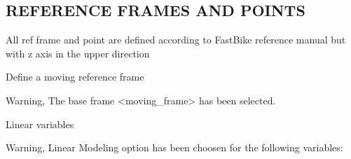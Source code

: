 \documentclass{article}
\begin{document}
\subsection{\textbf{REFERENCE FRAMES AND POINTS}}
\begin{maplegroup}
\begin{Maple Normal}{
All ref frame and point are defined according to FastBike reference manual but with z axis in the upper direction}\end{Maple Normal}

\end{maplegroup}
\begin{maplegroup}
\begin{Maple Normal}{
Define a moving reference frame}\end{Maple Normal}

\end{maplegroup}
\begin{maplegroup}
\begin{mapleinput}
\end{mapleinput}
\mapleresult
\underline{}Warning, The base frame <moving\_frame> has been selected.\underline{}\end{maplegroup}
\begin{maplegroup}
\begin{Maple Normal}{
Linear variables}\end{Maple Normal}

\end{maplegroup}
\begin{maplegroup}
\begin{mapleinput}
\end{mapleinput}
\mapleresult
\underline{}Warning, Linear Modeling option has been choosen for the following variables:\underline{}\mapleresult
\begin{maplelatex}
\end{maplelatex}
\end{maplegroup}
\end{document}
